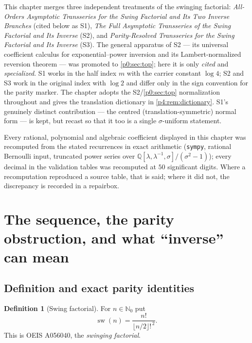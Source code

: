 \documentclass[11pt,a4paper,oneside]{book}
\theoremstyle{plain}
\theoremstyle{definition}
\newtheorem{definition}[theorem]{Definition}
\theoremstyle{remark}
\newcommand{\Nat}{\mathbb{N}}
\newcommand{\Rat}{\mathbb{Q}}
\begin{document}
\begin{sourcebox}
This chapter merges three independent treatments of the swinging factorial:
\emph{All-Orders Asymptotic Transseries for the Swing Factorial and Its Two
Inverse Branches} (cited below as \textsf{S1}), \emph{The Full Asymptotic
Transseries of the Swing Factorial and Its Inverse} (\textsf{S2}), and
\emph{Parity-Resolved Transseries for the Swing Factorial and Its Inverse}
(\textsf{S3}).  The general apparatus of \textsf{S2} --- its universal
coefficient calculus for exponential--power inversion and its
Lambert-normalized reversion theorem --- was promoted to \cref{p0:sec:top};
here it is only \emph{cited} and \emph{specialized}.  \textsf{S1} works in the
half index $m$ with the carrier constant $\log4$; \textsf{S2} and \textsf{S3}
work in the original index with $\log2$ and differ only in the sign convention
for the parity marker.  The chapter adopts the \textsf{S2}/\cref{p0:sec:top}
normalization throughout and gives the translation dictionary in
\cref{p4:rem:dictionary}.  \textsf{S1}'s genuinely distinct contribution --- the
centred (translation-symmetric) normal form --- is kept, but recast so that it
too is a single $\sigma$-uniform statement.

Every rational, polynomial and algebraic coefficient displayed in this chapter
was recomputed from the stated recurrences in exact arithmetic
(\texttt{sympy}, rational Bernoulli input, truncated power series over
$\Rat[\lambda,\lambda^{-1},\sigma]/(\sigma^2-1)$); every decimal in the
validation tables was recomputed at $50$ significant digits.  Where a
recomputation reproduced a source table, that is said; where it did not, the
discrepancy is recorded in a \textsf{repairbox}.
\end{sourcebox}

\section{The sequence, the parity obstruction, and what ``inverse'' can mean}
\label{p4:sec:elementary}

\subsection{Definition and exact parity identities}

\begin{definition}[Swing factorial]
\label{p4:def:swing}
For $n\in\Nat_0$ put
\begin{equation}
  \operatorname{sw}(n)=\frac{n!}{\lfloor n/2\rfloor!^{\,2}}.
  \label{p4:eq:swing-def}
\end{equation}
This is OEIS A056040, the \emph{swinging factorial}.
\end{definition}
\end{document}
